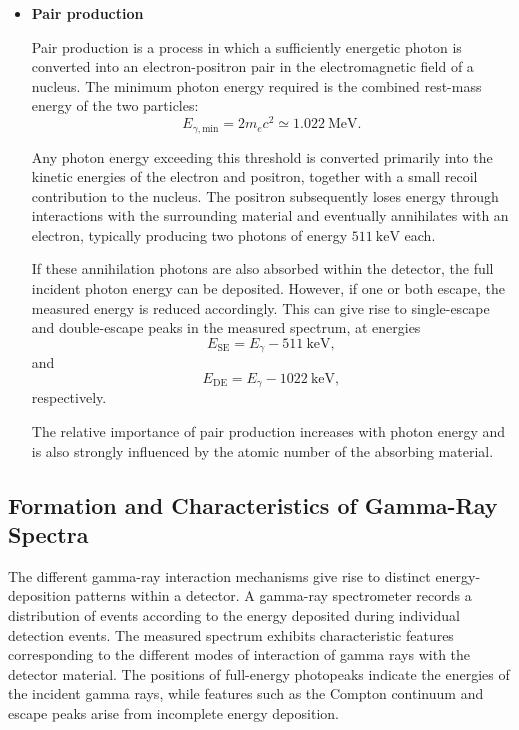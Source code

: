 \begin{itemize}
Compton scattering becomes increasingly important relative to photoelectric absorption over a broad intermediate range of gamma-ray energies. Its probability depends on the photon energy and the electron density of the absorbing material.

\item{\textbf{Pair production}}

Pair production is a process in which a sufficiently energetic photon is converted into an electron-positron pair in the electromagnetic field of a nucleus. The minimum photon energy required is the combined rest-mass energy of the two particles:
\begin{equation}
    E_{\gamma,\mathrm{min}}=2m_ec^2
    \simeq 1.022~\mathrm{MeV}.
\end{equation}

Any photon energy exceeding this threshold is converted primarily into the kinetic energies of the electron and positron, together with a small recoil contribution to the nucleus. The positron subsequently loses energy through interactions with the surrounding material and eventually annihilates with an electron, typically producing two photons of energy $511~\mathrm{keV}$ each.

If these annihilation photons are also absorbed within the detector, the full incident photon energy can be deposited. However, if one or both escape, the measured energy is reduced accordingly. This can give rise to single-escape and double-escape peaks in the measured spectrum, at energies
\begin{equation}
    E_{\mathrm{SE}}=E_\gamma-511~\mathrm{keV},
\end{equation}
and
\begin{equation}
    E_{\mathrm{DE}}=E_\gamma-1022~\mathrm{keV},
\end{equation}
respectively.

The relative importance of pair production increases with photon energy and is also strongly influenced by the atomic number of the absorbing material.
\end{itemize}

\subsection{Formation and Characteristics of Gamma-Ray Spectra}

The different gamma-ray interaction mechanisms give rise to distinct energy-deposition patterns within a detector. A gamma-ray spectrometer records a distribution of events according to the energy deposited during individual detection events. The measured spectrum exhibits characteristic features corresponding to the different modes of interaction of gamma rays with the detector material. The positions of full-energy photopeaks indicate the energies of the incident gamma rays, while features such as the Compton continuum and escape peaks arise from incomplete energy deposition.

